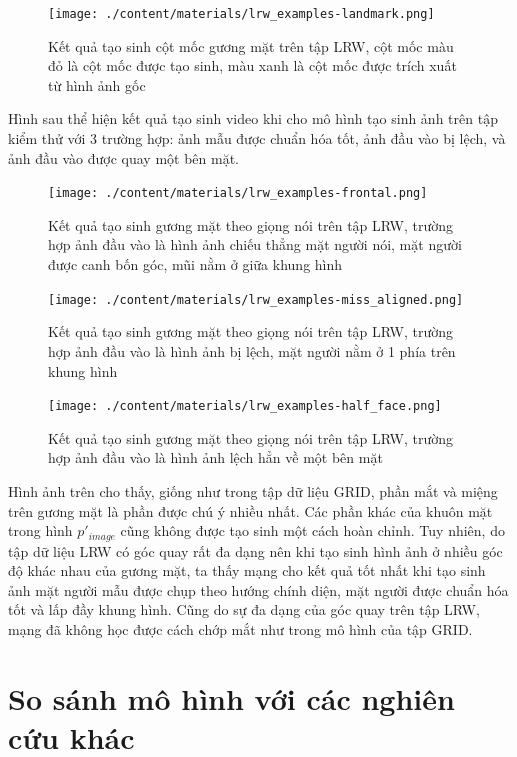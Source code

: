 \begin{figure}[H]
    \centering
    \texttt{[image: ./content/materials/lrw\_examples-landmark.png]}
    \caption{Kết quả tạo sinh cột mốc gương mặt trên tập LRW, cột mốc màu đỏ là cột mốc được tạo sinh, màu xanh là cột mốc được trích xuất từ hình ảnh gốc}
\end{figure}

Hình sau thể hiện kết quả tạo sinh video khi cho mô hình tạo sinh ảnh trên tập kiểm thử với 3 trường hợp: ảnh mẫu được chuẩn hóa tốt, ảnh đầu vào bị lệch, và ảnh đầu vào được quay một bên mặt.

\begin{figure}[H]
    \centering
    \texttt{[image: ./content/materials/lrw\_examples-frontal.png]}
    \caption{Kết quả tạo sinh gương mặt theo giọng nói trên tập LRW, trường hợp ảnh đầu vào là hình ảnh chiếu thẳng mặt người nói, mặt người được canh bốn góc, mũi nằm ở giữa khung hình}
\end{figure}

\begin{figure}[H]
    \centering
    \texttt{[image: ./content/materials/lrw\_examples-miss\_aligned.png]}
    \caption{Kết quả tạo sinh gương mặt theo giọng nói trên tập LRW, trường hợp ảnh đầu vào là hình ảnh bị lệch, mặt người nằm ở 1 phía trên khung hình}
\end{figure}

\begin{figure}[H]
    \centering
    \texttt{[image: ./content/materials/lrw\_examples-half\_face.png]}
    \caption{Kết quả tạo sinh gương mặt theo giọng nói trên tập LRW, trường hợp ảnh đầu vào là hình ảnh lệch hẳn về một bên mặt}
\end{figure}

Hình ảnh trên cho thấy, giống như trong tập dữ liệu GRID, phần mắt và miệng trên gương mặt là phần được chú ý nhiều nhất. Các phần khác của khuôn mặt trong hình  $p'_{image}$ cũng không được tạo sinh một cách hoàn chỉnh. Tuy nhiên, do tập dữ liệu LRW có góc quay rất đa dạng nên khi tạo sinh hình ảnh ở nhiều góc độ khác nhau của gương mặt, ta thấy mạng cho kết quả tốt nhất khi tạo sinh ảnh mặt người mẫu được chụp theo hướng chính diện, mặt người được chuẩn hóa tốt và lấp đầy khung hình. Cũng do sự đa dạng của góc quay trên tập LRW, mạng đã không học được cách chớp mắt như trong mô hình của tập GRID.

\section{So sánh mô hình với các nghiên cứu khác}

